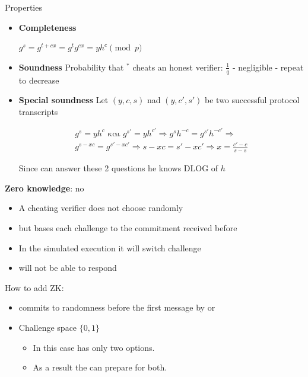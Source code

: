 \documentclass[handout]{beamer}
\begin{document}
\begin{frame}[allowframebreaks]{Properties}

\begin{itemize}
\item \textbf{Completeness}
    \begin{center}
    $g^s = g^{t+cx} = g^t g^{cx} = yh^c \pmod{p}$
    \end{center}
 
\item \textbf{Soundness} 
Probability that \prv$^*$ cheats an honest verifier: $\frac{1}{q}$ - negligible - repeat to decrease
 
\item \textbf{Special soundness}
Let $(y,c,s)$ nad  $(y,c',s')$ be two successful protocol transcripts
 
\begin{align*}
 g^s = yh^c  \text{ και }  g^{s'} = yh^{c'}  \Rightarrow  g^s h^{-c}   = g^{s'} h^{-c'}  \Rightarrow \\
 g^{s-xc} = g^{s'-xc'} \Rightarrow  s-xc = s'-xc' \Rightarrow  
 x = \frac{c'-c}{s-s}
\end{align*}
 
Since \prv can answer these 2 questions he knows DLOG of $h$
\end{itemize}

\framebreak

\textbf{Zero knowledge}: \alert{no}
 
\begin{itemize}
\item A cheating verifier does not choose randomly  
\item but bases each challenge to the commitment received before \siml  
\item In the simulated execution it will switch challenge  
\item \siml will not be able to respond 
\end{itemize}

How to add ZK:  

\begin{itemize}
\item \ver commits to randomness before the first message by  \prv or 
\item Challenge space $\{ 0 , 1 \} $ 
\begin{itemize}
\item In this case \ver has only two options. 
\item As a result the \siml can prepare for both.
\end{itemize} 
\end{itemize} 


\end{frame}
\end{document}
